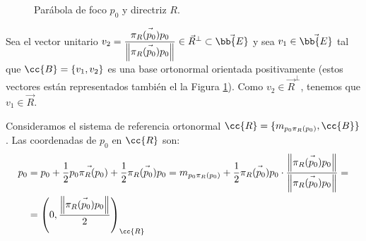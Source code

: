 \begin{ejercicio}
\begin{enumerate}
\begin{figure}[H]
        \caption{Parábola de foco $p_0$ y directriz $R$.}  
        \label{fig:ej5.3.8.Parabola}
    \end{figure}

    Sea el vector unitario $v_2=\dfrac{\vec{\pi_R(p_0)p_0}}{\left\|\vec{\pi_R(p_0)p_0}\right\|}\in \vec{R}^\perp \subset \vec{\bb{E}}$
    y sea $v_1\in \vec{\bb{E}}$ tal que $\cc{B}=\{v_1,v_2\}$ es una base ortonormal orientada positivamente (estos vectores están representados también el la Figura \ref{fig:ej5.3.8.Parabola}).
    Como $v_2\in \vec{R}^\perp$, tenemos que $v_1\in \vec{R}$.


    Consideramos el sistema de referencia ortonormal $\cc{R}=\{m_{p_0\pi_R(p_0)},\cc{B}\}$. Las coordenadas de $p_0$ en $\cc{R}$ son:
    \begin{align*}
        p_0 &= p_0 + \frac{1}{2}\vec{p_0\pi_R(p_0)} + \frac{1}{2}\vec{\pi_R(p_0)p_0} 
        = m_{p_0 \pi_R(p_0)} + \frac{1}{2}\vec{\pi_R(p_0)p_0} \cdot \dfrac{\left\|\vec{\pi_R(p_0)p_0}\right\|}{\left\|\vec{\pi_R(p_0)p_0}\right\|}
        =\\&= \left(0, \dfrac{\left\|\vec{\pi_R(p_0)p_0}\right\|}{2}\right)_{\cc{R}}
    \end{align*}


\end{enumerate}
\end{ejercicio}
